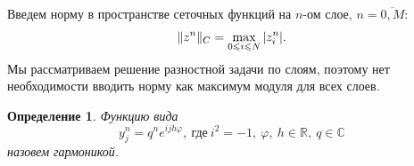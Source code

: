 \documentclass[11pt,a4paper,twoside,listtotoc,bibtotoc]{report}
\numberwithin{equation}{section}
\newtheorem*{definition}{Определение}
\theoremstyle{definition}
\theoremstyle{plain}
\DeclarePairedDelimiter\norm{\lVert}{\rVert}
\begin{document}
Введем норму в пространстве сеточных функций на $n$-ом слое,
$n=\overline{0, M}$:
%
$$
    \norm{z^n}_C=\max_{0\leqslant i\leqslant N}|z_i^n|.
$$
%
Мы рассматриваем решение разностной задачи по слоям, поэтому нет необходимости
вводить норму как максимум модуля для всех слоев.

\begin{definition}
%
    Функцию вида
    \begin{equation}
            \label{garmo}
            y_j^n = q^n e^{ijh\varphi},~\text{где}~i^2 = -1,~\varphi,~h \in \mathbb{R},~q \in \mathbb{C}
    \end{equation}
    назовем гармоникой.
%
\end{definition}
%
\fi %
\end{document}
